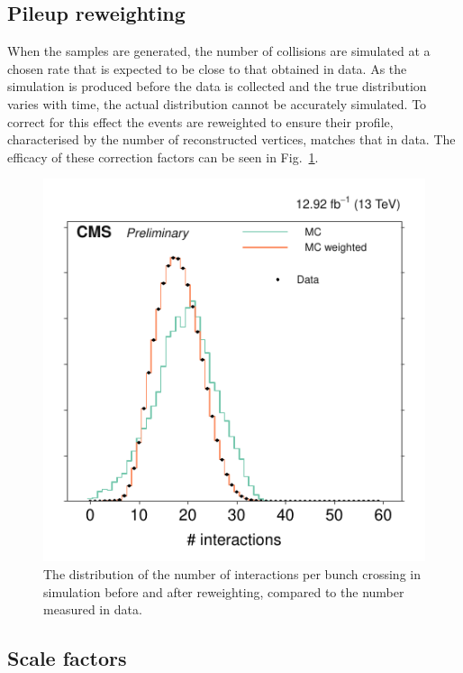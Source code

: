 \subsection{Pileup reweighting}

When the \MC samples are generated, the number of \PU collisions are
simulated at a chosen rate that is expected
to be close to that obtained in data. As the simulation is produced
before the data is collected and the true \PU distribution varies with
time, the actual distribution cannot be accurately simulated. To
correct for this effect the \MC events are reweighted to ensure their
\PU profile, characterised by the number of reconstructed vertices,
matches that in data. The efficacy of these correction factors can be
seen in Fig.~\ref{f044_corr_nTrueInt_data_mc_norm}.

\begin{figure}[!b]
\centering
\includegraphics[scale=1.00]{figs/analysis/puRw}
\caption{The distribution of the number of interactions per bunch
crossing in \MC simulation before and after reweighting, compared
to the number measured in data.} \label{f044_corr_nTrueInt_data_mc_norm}
\end{figure}

\subsection{Scale factors}
\label{sec:sfs}

